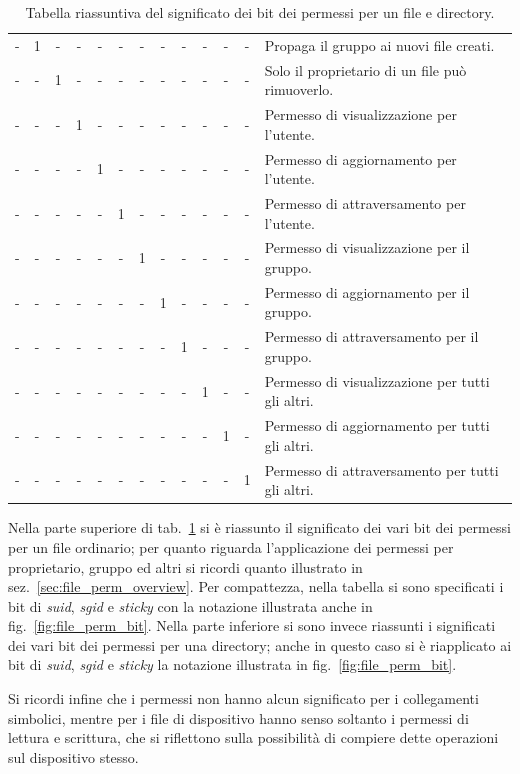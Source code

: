 \begin{table}[!htb]
\begin{tabular}[c]{|c|c|c|c|c|c|c|c|c|c|c|c|l|}
    -&1&-&-&-&-&-&-&-&-&-&-&Propaga il gruppo ai nuovi file creati.\\
    -&-&1&-&-&-&-&-&-&-&-&-&Solo il proprietario di un file può rimuoverlo.\\
    -&-&-&1&-&-&-&-&-&-&-&-&Permesso di visualizzazione per l'utente.\\
    -&-&-&-&1&-&-&-&-&-&-&-&Permesso di aggiornamento per l'utente.\\
    -&-&-&-&-&1&-&-&-&-&-&-&Permesso di attraversamento per l'utente.\\
    -&-&-&-&-&-&1&-&-&-&-&-&Permesso di visualizzazione per il gruppo.\\
    -&-&-&-&-&-&-&1&-&-&-&-&Permesso di aggiornamento per il gruppo.\\
    -&-&-&-&-&-&-&-&1&-&-&-&Permesso di attraversamento per il gruppo.\\
    -&-&-&-&-&-&-&-&-&1&-&-&Permesso di visualizzazione per tutti gli altri.\\
    -&-&-&-&-&-&-&-&-&-&1&-&Permesso di aggiornamento per tutti gli altri.\\
    -&-&-&-&-&-&-&-&-&-&-&1&Permesso di attraversamento per tutti gli altri.\\
    \hline
  \end{tabular}
  \caption{Tabella riassuntiva del significato dei bit dei permessi per un
    file e directory.} 
  \label{tab:file_fileperm_bits}
\end{table}

Nella parte superiore di tab.~\ref{tab:file_fileperm_bits} si è riassunto il
significato dei vari bit dei permessi per un file ordinario; per quanto
riguarda l'applicazione dei permessi per proprietario, gruppo ed altri si
ricordi quanto illustrato in sez.~\ref{sec:file_perm_overview}.  Per
compattezza, nella tabella si sono specificati i bit di \textit{suid},
\textit{sgid} e \textit{sticky} con la notazione illustrata anche in
fig.~\ref{fig:file_perm_bit}.  Nella parte inferiore si sono invece riassunti
i significati dei vari bit dei permessi per una directory; anche in questo
caso si è riapplicato ai bit di \textit{suid}, \textit{sgid} e \textit{sticky}
la notazione illustrata in fig.~\ref{fig:file_perm_bit}.

Si ricordi infine che i permessi non hanno alcun significato per i
collegamenti simbolici, mentre per i file di dispositivo hanno senso soltanto
i permessi di lettura e scrittura, che si riflettono sulla possibilità di
compiere dette operazioni sul dispositivo stesso.

